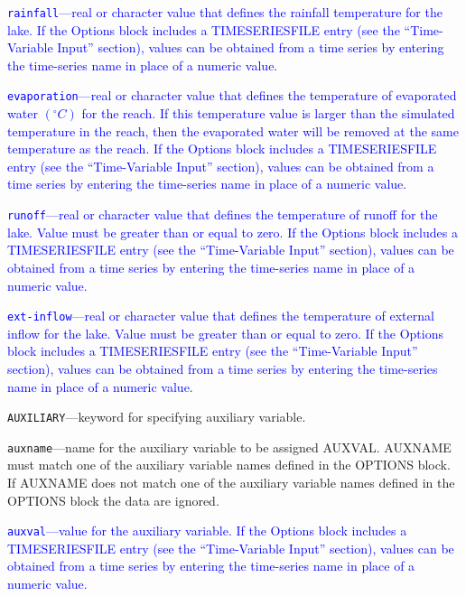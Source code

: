 \begin{description}
\item \textcolor{blue}{\texttt{rainfall}---real or character value that defines the rainfall temperature for the lake. If the Options block includes a TIMESERIESFILE entry (see the ``Time-Variable Input'' section), values can be obtained from a time series by entering the time-series name in place of a numeric value.}

\item \textcolor{blue}{\texttt{evaporation}---real or character value that defines the temperature of evaporated water $(^{\circ}C)$ for the reach. If this temperature value is larger than the simulated temperature in the reach, then the evaporated water will be removed at the same temperature as the reach.  If the Options block includes a TIMESERIESFILE entry (see the ``Time-Variable Input'' section), values can be obtained from a time series by entering the time-series name in place of a numeric value.}

\item \textcolor{blue}{\texttt{runoff}---real or character value that defines the temperature of runoff for the lake. Value must be greater than or equal to zero. If the Options block includes a TIMESERIESFILE entry (see the ``Time-Variable Input'' section), values can be obtained from a time series by entering the time-series name in place of a numeric value.}

\item \textcolor{blue}{\texttt{ext-inflow}---real or character value that defines the temperature of external inflow for the lake. Value must be greater than or equal to zero. If the Options block includes a TIMESERIESFILE entry (see the ``Time-Variable Input'' section), values can be obtained from a time series by entering the time-series name in place of a numeric value.}

\item \texttt{AUXILIARY}---keyword for specifying auxiliary variable.

\item \texttt{auxname}---name for the auxiliary variable to be assigned AUXVAL.  AUXNAME must match one of the auxiliary variable names defined in the OPTIONS block. If AUXNAME does not match one of the auxiliary variable names defined in the OPTIONS block the data are ignored.

\item \textcolor{blue}{\texttt{auxval}---value for the auxiliary variable. If the Options block includes a TIMESERIESFILE entry (see the ``Time-Variable Input'' section), values can be obtained from a time series by entering the time-series name in place of a numeric value.}

\end{description}

